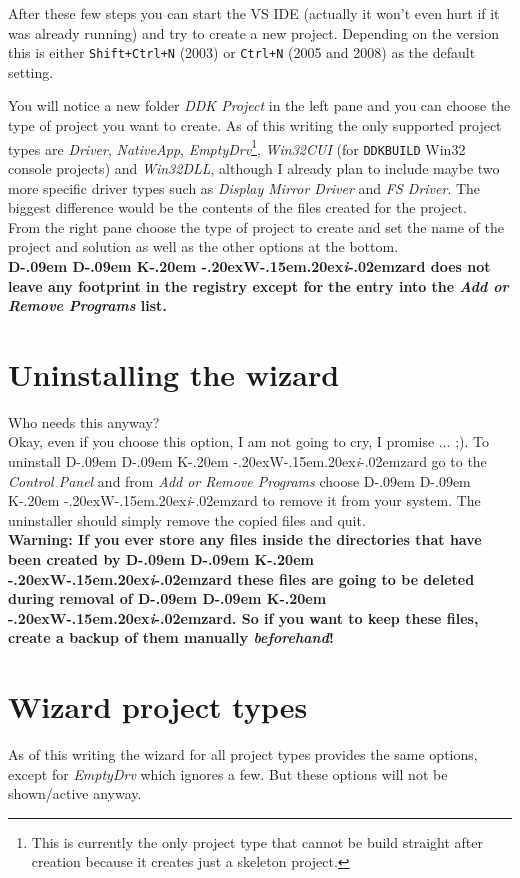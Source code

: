 \documentclass[a4paper,titlepage]{report}
\newcommand{\important}[1]{\textcolor[rgb]{0.90,0.00,0.00}{\textbf{#1}}}
\def\ddkwiz{D\kern-.09em D\kern-.09em K\kern-.20em \raise-.20ex\hbox{W}\kern-.15em\raise.20ex\hbox{\it{i}}\kern-.02em{zard}}
\begin{document}
After these few steps you can start the VS IDE (actually it won't even hurt if it
was already running) and try to create a new project. Depending on the version
this is either \texttt{Shift+Ctrl+N} (2003) or \texttt{Ctrl+N} (2005 and 2008)
as the default setting.

You will notice a new folder \emph{DDK Project} in the left pane and you
can choose the type of project you want to create. As of this writing the
only supported project types are \emph{Driver}, \emph{NativeApp}, \emph{EmptyDrv}\footnote{This
is currently the only project type that cannot be build straight after creation
because it creates just a skeleton project.}, \emph{Win32CUI} (for \texttt{DDKBUILD}
Win32 console projects) and \emph{Win32DLL}, although I already plan to include
maybe two more specific driver types such as \emph{Display Mirror Driver} and
\emph{FS Driver}. The biggest difference would be the contents of the files created
for the project.\\

From the right pane choose the type of project to create and set the name
of the project and solution as well as the other options at the bottom.\\

\important{\ddkwiz{} does not leave any footprint in the registry except for
the entry into the \emph{Add or Remove Programs} list.}

\section{Uninstalling the wizard}
Who needs this anyway?\\

Okay, even if you choose this option, I am not going to cry, I promise ... \textsf{;)}. To
uninstall \ddkwiz{} go to the \emph{Control Panel} and from \emph{Add or Remove Programs}
choose \ddkwiz{} to remove it from your system. The uninstaller should simply
remove the copied files and quit.\\

\important{Warning: If you ever store any files inside the directories that
have been created by \ddkwiz{} these files are going to be deleted during
removal of \ddkwiz{}. So if you want to keep these files, create a backup
of them manually \emph{beforehand}!}

\section{Wizard project types}
\label{sec:projtypes}
As of this writing the wizard for all project types provides the same options,
except for \emph{EmptyDrv} which ignores a few. But these options will not
be shown/active anyway.
\end{document}
